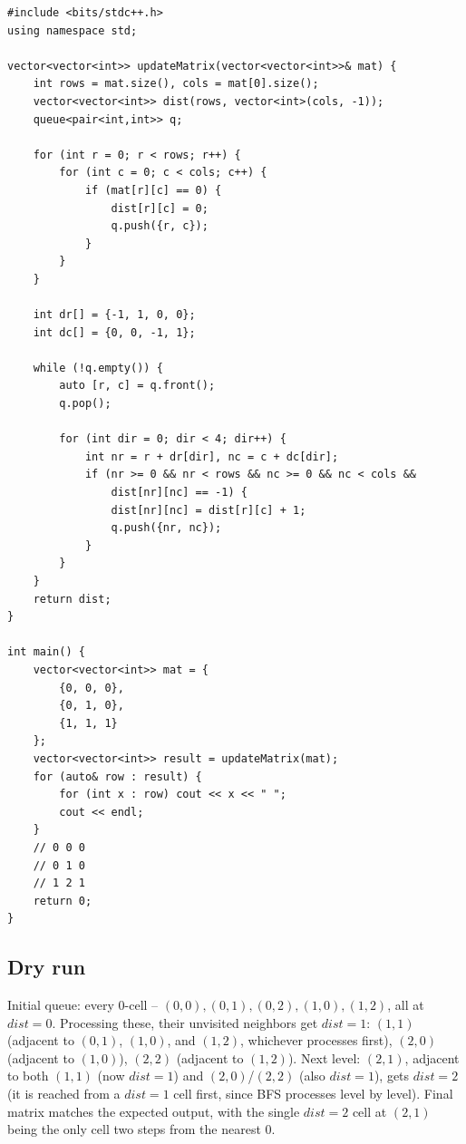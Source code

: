 \begin{lstlisting}
#include <bits/stdc++.h>
using namespace std;

vector<vector<int>> updateMatrix(vector<vector<int>>& mat) {
    int rows = mat.size(), cols = mat[0].size();
    vector<vector<int>> dist(rows, vector<int>(cols, -1));
    queue<pair<int,int>> q;

    for (int r = 0; r < rows; r++) {
        for (int c = 0; c < cols; c++) {
            if (mat[r][c] == 0) {
                dist[r][c] = 0;
                q.push({r, c});
            }
        }
    }

    int dr[] = {-1, 1, 0, 0};
    int dc[] = {0, 0, -1, 1};

    while (!q.empty()) {
        auto [r, c] = q.front();
        q.pop();

        for (int dir = 0; dir < 4; dir++) {
            int nr = r + dr[dir], nc = c + dc[dir];
            if (nr >= 0 && nr < rows && nc >= 0 && nc < cols &&
                dist[nr][nc] == -1) {
                dist[nr][nc] = dist[r][c] + 1;
                q.push({nr, nc});
            }
        }
    }
    return dist;
}

int main() {
    vector<vector<int>> mat = {
        {0, 0, 0},
        {0, 1, 0},
        {1, 1, 1}
    };
    vector<vector<int>> result = updateMatrix(mat);
    for (auto& row : result) {
        for (int x : row) cout << x << " ";
        cout << endl;
    }
    // 0 0 0
    // 0 1 0
    // 1 2 1
    return 0;
}
\end{lstlisting}

\subsection*{Dry run}


Initial queue: every $0$-cell -- $(0,0),(0,1),(0,2),(1,0),(1,2)$, all
at $\textit{dist}=0$. Processing these, their unvisited neighbors get
$\textit{dist}=1$: $(1,1)$ (adjacent to $(0,1)$, $(1,0)$, and $(1,2)$,
whichever processes first), $(2,0)$ (adjacent to $(1,0)$), $(2,2)$
(adjacent to $(1,2)$). Next level: $(2,1)$, adjacent to both
$(1,1)$ (now $\textit{dist}=1$) and $(2,0)$/$(2,2)$ (also
$\textit{dist}=1$), gets $\textit{dist}=2$ (it is reached from a
$\textit{dist}=1$ cell first, since BFS processes level by level).
Final matrix matches the expected output, with the single $\textit{dist}=2$
cell at $(2,1)$ being the only cell two steps from the nearest $0$.

